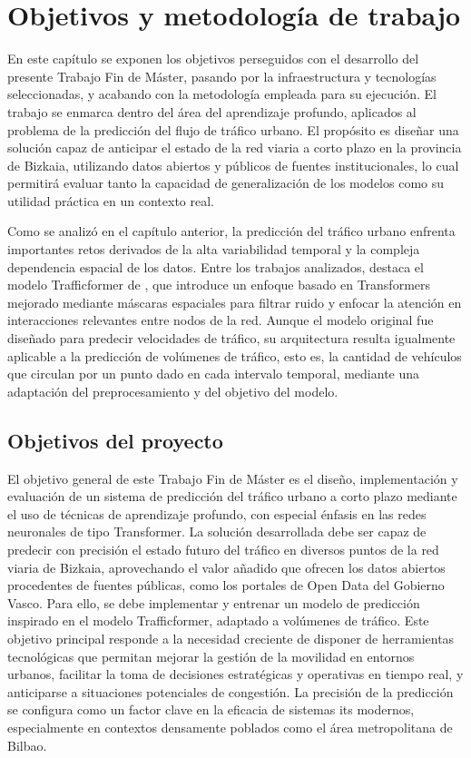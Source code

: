 \section{Objetivos y metodología de trabajo}
\label{sec:obj_metd}

En este capítulo se exponen los objetivos perseguidos con el desarrollo del presente Trabajo Fin de Máster, pasando por la infraestructura y tecnologías seleccionadas, y acabando con la metodología empleada para su ejecución. El trabajo se enmarca dentro del área del aprendizaje profundo, aplicados al problema de la predicción del flujo de tráfico urbano. El propósito es diseñar una solución capaz de anticipar el estado de la red viaria a corto plazo en la provincia de Bizkaia, utilizando datos abiertos y públicos de fuentes institucionales, lo cual permitirá evaluar tanto la capacidad de generalización de los modelos como su utilidad práctica en un contexto real. 

Como se analizó en el capítulo anterior, la predicción del tráfico urbano enfrenta importantes retos derivados de la alta variabilidad temporal y la compleja dependencia espacial de los datos. Entre los trabajos analizados, destaca el modelo Trafficformer de \cite{trafficformer}, que introduce un enfoque basado en Transformers mejorado mediante máscaras espaciales para filtrar ruido y enfocar la atención en interacciones relevantes entre nodos de la red. Aunque el modelo original fue diseñado para predecir velocidades de tráfico, su arquitectura resulta igualmente aplicable a la predicción de volúmenes de tráfico, esto es, la cantidad de vehículos que circulan por un punto dado en cada intervalo temporal, mediante una adaptación del preprocesamiento y del objetivo del modelo.

\subsection{Objetivos del proyecto}

El objetivo general de este Trabajo Fin de Máster es el diseño, implementación y evaluación de un sistema de predicción del tráfico urbano a corto plazo mediante el uso de técnicas de aprendizaje profundo, con especial énfasis en las redes neuronales de tipo Transformer. La solución desarrollada debe ser capaz de predecir con precisión el estado futuro del tráfico en diversos puntos de la red viaria de Bizkaia, aprovechando el valor añadido que ofrecen los datos abiertos procedentes de fuentes públicas, como los portales de Open Data del Gobierno Vasco. Para ello, se debe implementar y entrenar un modelo de predicción inspirado en el modelo Trafficformer, adaptado a volúmenes de tráfico. Este objetivo principal responde a la necesidad creciente de disponer de herramientas tecnológicas que permitan mejorar la gestión de la movilidad en entornos urbanos, facilitar la toma de decisiones estratégicas y operativas en tiempo real, y anticiparse a situaciones potenciales de congestión. La precisión de la predicción se configura como un factor clave en la eficacia de sistemas \acrshort{its} modernos, especialmente en contextos densamente poblados como el área metropolitana de Bilbao. 

